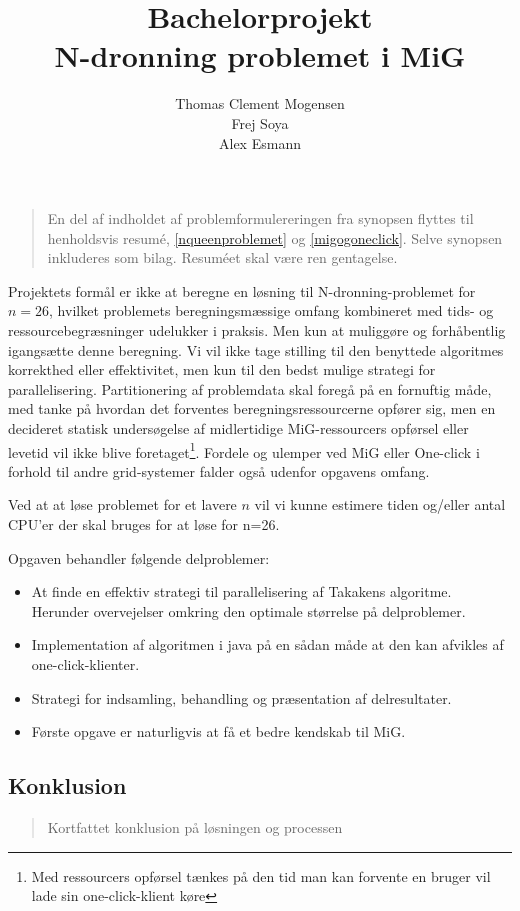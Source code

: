 \documentclass[final,a4paper,10pt]{article}
\title{Bachelorprojekt\\N-dronning problemet i MiG}
\author{Thomas Clement Mogensen \\ Frej Soya \\ Alex Esmann }
\begin{document}
\maketitle
\tableofcontents

\newpage
\setcounter{page}{1}
\abstract
\begin{verse}
	En del af indholdet af problemformulereringen fra synopsen flyttes til henholdsvis resumé, \ref{nqueenproblemet} og \ref{migogoneclick}. Selve synopsen inkluderes som bilag. Resuméet skal være ren gentagelse.
\end{verse}
Projektets formål er ikke at beregne en løsning til N-dronning-problemet for $n=26$, hvilket problemets beregningsmæssige omfang kombineret med tids- og ressourcebegræsninger udelukker i praksis. Men kun at muliggøre og forhåbentlig igangsætte denne beregning.
Vi vil ikke tage stilling til den benyttede algoritmes korrekthed eller effektivitet, men kun til den bedst mulige strategi for parallelisering. Partitionering af problemdata skal foregå på en fornuftig måde, med tanke på hvordan det forventes beregningsressourcerne opfører sig, men en decideret statisk undersøgelse af midlertidige MiG-ressourcers opførsel eller levetid vil ikke blive foretaget\footnote{Med ressourcers opførsel tænkes på den tid man kan forvente en bruger vil lade sin one-click-klient køre}. Fordele og ulemper ved MiG eller One-click i forhold til andre grid-systemer falder også udenfor opgavens omfang.

Ved at at løse problemet for et lavere $n$ vil vi kunne estimere tiden og/eller antal CPU'er der skal bruges for at løse for n=26.

 Opgaven behandler følgende delproblemer:
\begin{itemize}
\item At finde en effektiv strategi til parallelisering af Takakens algoritme. Herunder overvejelser omkring den optimale størrelse på delproblemer.
\item Implementation af algoritmen i java på en sådan måde at den kan afvikles af one-click-klienter.
\item Strategi for indsamling, behandling og præsentation af delresultater.
\item Første opgave er naturligvis at få et bedre kendskab til MiG.
\end{itemize}


\subsection*{Konklusion}\label{konklusion}
\begin{verse}
	Kortfattet konklusion på løsningen og processen
\end{verse}
\end{document}
